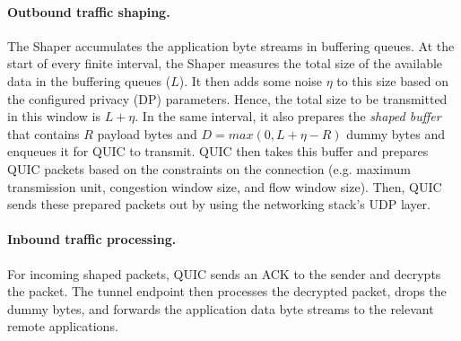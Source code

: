 \paragraph{Outbound traffic shaping.}
The Shaper accumulates the application byte streams in buffering queues.
At the start of every finite interval, the Shaper measures the total size of the available data in the buffering queues ($L$). 
It then adds some noise $\eta$ to this size based on the configured privacy (DP) parameters.
Hence, the total size to be transmitted in this window is $L + \eta$.
In the same interval, it also prepares the \textit{shaped buffer} that contains $R$ payload bytes and $D = max(0, L + \eta - R)$ dummy bytes and enqueues it for QUIC to transmit.
QUIC then takes this buffer and prepares QUIC packets based on the constraints on the connection (e.g. maximum transmission unit, congestion window size, and flow window size).
Then, QUIC sends these prepared packets out by using the networking stack's UDP layer.

\paragraph{Inbound traffic processing.}
For incoming shaped packets, QUIC sends an ACK to the sender and decrypts the packet.
The tunnel endpoint then processes the decrypted packet, drops the dummy bytes, and forwards the application data byte streams to the relevant remote applications.
